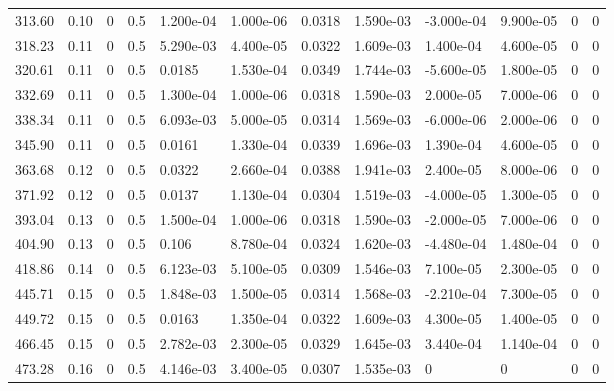 \documentclass[preview]{standalone}
\begin{document}
{{\begin{tabular}{L{1.2cm}C{1.2cm} C{0.3cm}C{0.5cm} C{1.4cm}C{1.4cm} C{1.4cm}C{1.4cm} C{1.6cm}C{1.6cm} C{1.6cm}C{1.6cm}}
  313.60  &  0.10  & 0     & 0.5 &  1.200e-04  & 1.000e-06  &  0.0318&   1.590e-03& -3.000e-04 & 9.900e-05   &  0 & 0  \\ 
  318.23  &  0.11  & 0     & 0.5 &  5.290e-03  & 4.400e-05  &  0.0322&   1.609e-03& 1.400e-04 & 4.600e-05   &  0 & 0  \\ 
  320.61  &  0.11  & 0     & 0.5 &  0.0185  & 1.530e-04  &  0.0349&   1.744e-03& -5.600e-05 & 1.800e-05   &  0 & 0  \\ 
  332.69  &  0.11  & 0     & 0.5 &  1.300e-04  & 1.000e-06  &  0.0318&   1.590e-03& 2.000e-05 & 7.000e-06   &  0 & 0  \\ 
  338.34  &  0.11  & 0     & 0.5 &  6.093e-03  & 5.000e-05  &  0.0314&   1.569e-03& -6.000e-06 & 2.000e-06   &  0 & 0  \\ 
  345.90  &  0.11  & 0     & 0.5 &  0.0161  & 1.330e-04  &  0.0339&   1.696e-03& 1.390e-04 & 4.600e-05   &  0 & 0  \\ 
  363.68  &  0.12  & 0     & 0.5 &  0.0322  & 2.660e-04  &  0.0388&   1.941e-03& 2.400e-05 & 8.000e-06   &  0 & 0  \\ 
  371.92  &  0.12  & 0     & 0.5 &  0.0137  & 1.130e-04  &  0.0304&   1.519e-03& -4.000e-05 & 1.300e-05   &  0 & 0  \\ 
  393.04  &  0.13  & 0     & 0.5 &  1.500e-04  & 1.000e-06  &  0.0318&   1.590e-03& -2.000e-05 & 7.000e-06   &  0 & 0  \\ 
  404.90  &  0.13  & 0     & 0.5 &  0.106  & 8.780e-04  &  0.0324&   1.620e-03& -4.480e-04 & 1.480e-04   &  0 & 0  \\ 
  418.86  &  0.14  & 0     & 0.5 &  6.123e-03  & 5.100e-05  &  0.0309&   1.546e-03& 7.100e-05 & 2.300e-05   &  0 & 0  \\ 
  445.71  &  0.15  & 0     & 0.5 &  1.848e-03  & 1.500e-05  &  0.0314&   1.568e-03& -2.210e-04 & 7.300e-05   &  0 & 0  \\ 
  449.72  &  0.15  & 0     & 0.5 &  0.0163  & 1.350e-04  &  0.0322&   1.609e-03& 4.300e-05 & 1.400e-05   &  0 & 0  \\ 
  466.45  &  0.15  & 0     & 0.5 &  2.782e-03  & 2.300e-05  &  0.0329&   1.645e-03& 3.440e-04 & 1.140e-04   &  0 & 0  \\ 
  473.28  &  0.16  & 0     & 0.5 &  4.146e-03  & 3.400e-05  &  0.0307&   1.535e-03& 0 & 0   &  0 & 0  \\ 
\hline 
\end{tabular} 

}}
\end{document}
